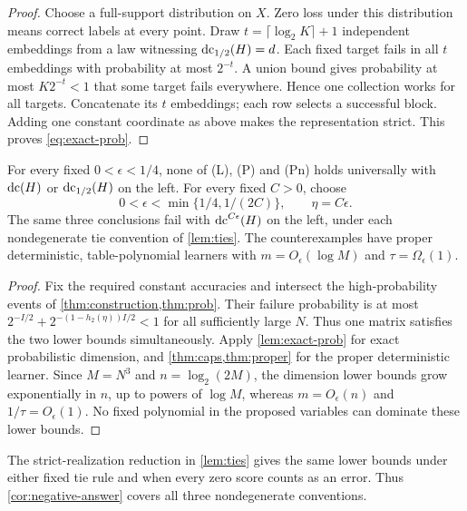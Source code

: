 \begin{proof}
Choose a full-support distribution on $X$. Zero loss under this distribution means correct labels at every point. Draw $t=\lceil\log_2K\rceil+1$ independent embeddings from a law witnessing $\operatorname{dc}_{1/2}(H)=d$. Each fixed target fails in all $t$ embeddings with probability at most $2^{-t}$. A union bound gives probability at most $K2^{-t}<1$ that some target fails everywhere. Hence one collection works for all targets. Concatenate its $t$ embeddings; each row selects a successful block. Adding one constant coordinate as above makes the representation strict. This proves \eqref{eq:exact-prob}. 
\end{proof}



\begin{corollary}\label{cor:negative-answer}
For every fixed $0<\epsilon<1/4$, none of (L), (P) and (Pn) holds universally with $\operatorname{dc}(H)$ or $\operatorname{dc}_{1/2}(H)$ on the left. For every fixed $C>0$, choose
\[
 0<\epsilon<\min\{1/4,1/(2C)\},\qquad\eta=C\epsilon.
\]
The same three conclusions fail with $\operatorname{dc}^{C\epsilon}(H)$ on the left, under each nondegenerate tie convention of \cref{lem:ties}. The counterexamples have proper deterministic, table-polynomial learners with $m=O_\epsilon(\log M)$ and $\tau=\Omega_\epsilon(1)$.
\end{corollary}
\begin{proof}
Fix the required constant accuracies and intersect the high-probability events of \cref{thm:construction,thm:prob}. Their failure probability is at most $2^{-I/2}+2^{-(1-h_2(\eta))I/2}<1$ for all sufficiently large $N$. Thus one matrix satisfies the two lower bounds simultaneously. Apply \cref{lem:exact-prob} for exact probabilistic dimension, and \cref{thm:caps,thm:proper} for the proper deterministic learner. Since $M=N^3$ and $n=\log_2(2M)$, the dimension lower bounds grow exponentially in $n$, up to powers of $\log M$, whereas $m=O_\epsilon(n)$ and $1/\tau=O_\epsilon(1)$. No fixed polynomial in the proposed variables can dominate these lower bounds.
\end{proof}


The strict-realization reduction in \cref{lem:ties} gives the same lower bounds under either fixed tie rule and when every zero score counts as an error. Thus \cref{cor:negative-answer} covers all three nondegenerate conventions.
